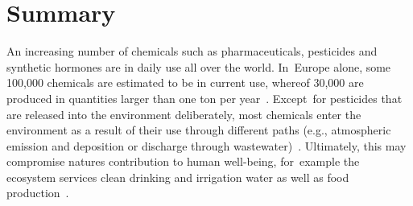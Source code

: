 \documentclass[data,datadescriptor,accept,moreauthors,pdftex]{Definitions/mdpi}
\begin{document}


\section{Summary}
An increasing number of chemicals such as pharmaceuticals, pesticides and synthetic hormones are in daily use all over the world. In~Europe alone, some 100,000 chemicals are estimated to be in current use, whereof 30,000 are produced in quantities larger than one ton per year~\citep{breithaupt_costs_2006}. Except~for pesticides that are released into the environment deliberately, most chemicals enter the environment as a result of their use through different paths (e.g., atmospheric emission and deposition or discharge through wastewater)~\citep{schwarzenbach_challenge_2006}.  Ultimately, this may compromise natures contribution to human well-being, for~example the ecosystem services clean drinking and irrigation water as well as food production~\citep{peters_review_2013, vandersluijs_neonicotinoids_2013, yamamuro_neonicotinoids_2019}. 
\end{document}
